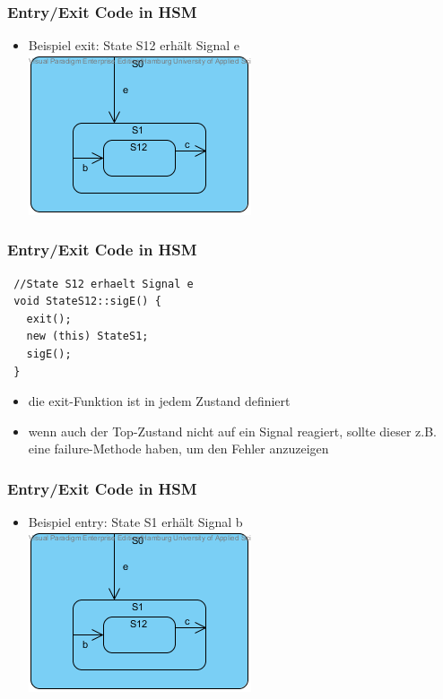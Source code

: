\documentclass{beamer}
\begin{document}
\begin{frame}
 \frametitle{Entry/Exit Code in HSM }
 \begin{itemize}
  \item Beispiel exit: State S12 erh\"alt Signal e\newline\newline
  \includegraphics[scale=.8]{img/beispiel_exitSM}
 \end{itemize}
\end{frame}

\begin{frame}[fragile]
 \frametitle{Entry/Exit Code in HSM }
 \begin{lstlisting}
 //State S12 erhaelt Signal e
 void StateS12::sigE() {
   exit();
   new (this) StateS1;
   sigE();
 }
 \end{lstlisting}
 \begin{itemize}
  \item die exit-Funktion ist in jedem Zustand definiert
  \item wenn auch der Top-Zustand nicht auf ein Signal reagiert, sollte dieser z.B. eine
  failure-Methode haben, um den Fehler anzuzeigen
 \end{itemize}
\end{frame}

\begin{frame}
 \frametitle{Entry/Exit Code in HSM  }
 \begin{itemize}
  \item Beispiel entry: State S1 erh\"alt Signal b\newline\newline
  \includegraphics[scale=.8]{img/beispiel_exitSM}
 \end{itemize}
\end{frame}
\end{document}
